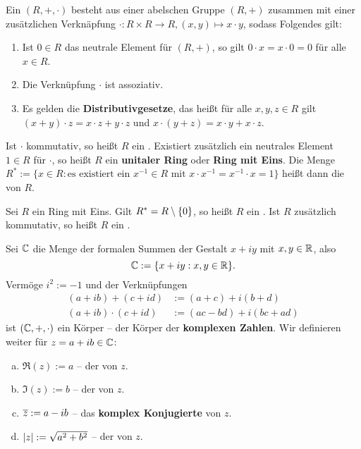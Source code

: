 \begin{definition}[Ring]
	\label{def:I.4.5}
	Ein  $(R,+,\cdot)$ besteht aus einer abelschen Gruppe $(R,+)$ zusammen mit einer zusätzlichen Verknäpfung $\cdot \colon R \times R \rightarrow R, (x,y) \mapsto x \cdot y$, sodass Folgendes gilt:
	\begin{enumerate}[(1)]
		\item Ist $0 \in R$ das neutrale Element für $(R,+)$, so gilt $0 \cdot x = x \cdot 0 = 0$ für alle $x \in R$.
		\item Die Verknüpfung $\cdot$ ist assoziativ.
		\item Es gelden die \textbf{Distributivgesetze}, das heißt für alle $x,y,z \in R$ gilt $(x+y) \cdot z = x\cdot z + y \cdot z$ und $x\cdot(y+z) = x \cdot y + x \cdot z$. 
	\end{enumerate}
	Ist $\cdot$ kommutativ, so heißt $R$ ein .
	Existiert zusätzlich ein neutrales Element $1 \in R$ für $\cdot$, so heißt $R$ ein \textbf{unitaler Ring} oder \textbf{Ring mit Eins}.
	Die Menge $R^* := \{x \in R : \text{es existiert ein } x^{-1} \in R \text{ mit } x \cdot x^{-1} = x^{-1} \cdot x = 1\}$ heißt dann die  von $R$.   
\end{definition}

\setcounter{definition}{6}
\begin{definition}
	\label{def:I.4.7}
	Sei $R$ ein Ring mit Eins.
	Gilt $R^* = R \setminus \{0\}$, so heißt $R$ ein .
	Ist $R$ zusätzlich kommutativ, so heißt $R$ ein .
\end{definition}

\setcounter{definition}{9}
\begin{definition}
	\label{def:I.4.10}
	Sei $\mathbb{C}$ die Menge der formalen Summen der Gestalt $x+iy$ mit $x,y \in \mathbb{R}$, also
	\[
		\mathbb{C}:= \{x+iy : x,y \in \mathbb{R}\}.
	\]
	Vermöge $i^2 := -1$ und der Verknüpfungen
	\begin{align*}
		(a+ib) + (c+id) &:= (a+c) + i(b+d) \\
		(a+ib) \cdot (c+id) &:= (ac-bd) + i(bc+ad)
	\end{align*}
	ist $(\mathbb{C},+,\cdot)$ ein Körper -- der Körper der \textbf{komplexen Zahlen}. 
	Wir definieren weiter für $z = a+ib \in \mathbb{C}$:
	\begin{enumerate}[a)]
		\item $\Re(z) := a$ -- der  von $z$.
		\item $\Im(z) := b$ -- der  von $z$.
		\newpage
		\item $\overline{z} := a-ib$ -- das \textbf{komplex Konjugierte} von $z$. 
		\item $\lvert z\rvert := \sqrt{a^2+b^2}$ -- der  von $z$.
	\end{enumerate}
\end{definition}

